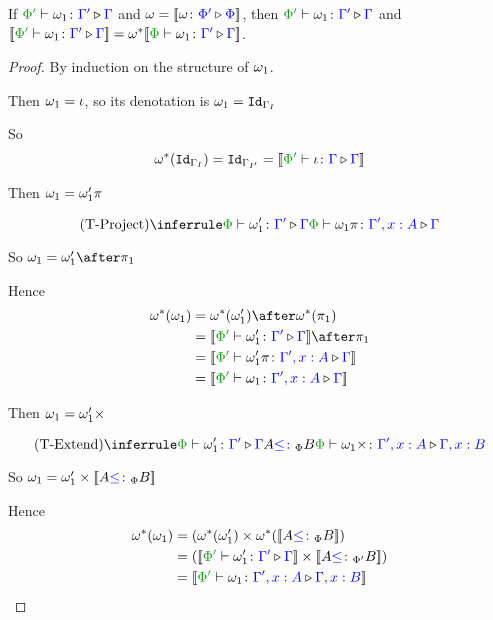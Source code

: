 \documentclass{report}
\begin{document}
\begin{theorem}
    If $\ewrel{\P'}{\w_1}{\G'}{\G}$ and $\omega = {\bf [\![}\omega \colon {\color{blue}\Phi'} \triangleright {\color {blue} \Phi}{\bf ]\!]}$, then $\ewrel{\P'}{\w_1}{\G'}{\G}$ and $\deno{\ewrel{\P'}{\w_1}{\G'}{\G}} = \w\star\deno{\ewrel{\P}{\w_1}{\G'}{\G}}$.
\end{theorem}




\begin{framed}
    \begin{proof}
        
        By induction on the structure of $\omega_1$.
        
        \case{\tid}
        Then $\omega_1 = \iota$, so its denotation is $\omega_1 = \texttt{Id}_{\Gamma_I}$
        
        So
        \begin{equation}
          \w\star(\Id{\G_I}) = \Id{\G_{I'}} = \deno{\ewrel{\P'}{\i}{\G}{\G}}  
        \end{equation}
        
        \case{\tproject}
        Then $\omega_1 = \omega_1'\pi$
        
        \begin{equation}
            \ntreeruleI{\tproject}{\ewrel{\P}{\w_1'}{\G'}{\G}}{\ewrel{\P}{\w_1\pi}{\G',x:A}{\G}}
        \end{equation}
        
        So $\w_1 = \w_1'\after\p$
        
        Hence
        \begin{align*}
            \w\star(\w_1) &= \w\star(\w_1')\after\w\star(\p)\\
            & = \deno{\ewrel{\P'}{\w_1'}{\G'}{\G}}\after\p\\
            & = \deno{\ewrel{\P'}{\w_1'\pi}{\G',x:A}{\G}}\\
            & = \deno{\ewrel{\P'}{\w_1}{\G', x:A}{\G}}
        \end{align*}
        
        \case{\textend}
        Then $\omega_1 = \omega_1'\times$
        
        \begin{equation}
            \ntreeruleII{\textend}{\ewrel{\P}{\w_1'}{\G'}{\G}}{ A\subtypep B}{\ewrel{\P}{\w_1\x}{\G',x:A}{\G, x:B}}
        \end{equation}
        
        So $\omega_1 = \omega_1'\times{\bf [\![}A{\color{blue} \leq\colon}_\Phi B{\bf ]\!]}$
        
        Hence
        \begin{align*}
            \w\star(\w_1) &=(\w\star(\w_1')\times\w\star(\deno{A\subtypep B})\\
            & = (\deno{\ewrel{\P'}{\w_1'}{\G'}{\G}}\times\deno{A\subtypepp B})\\
            & = \deno{\ewrel{\P'}{\w_1}{\G',x:A}{\G,x:B}}
        \end{align*}
    \end{proof}
\end{framed}
\end{document}
